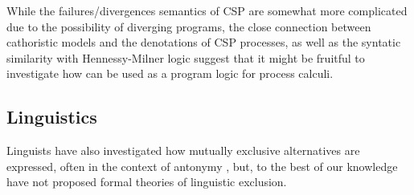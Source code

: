 While the failures/divergences semantics of CSP are somewhat more
complicated due to the possibility of diverging programs, the close
connection between cathoristic models and the denotations of CSP processes,
as well as the syntatic similarity with Hennessy-Milner logic suggest
that it might be fruitful to investigate how \cathoristic{} can be used
as a program logic for process calculi.

\subsection{Linguistics}

Linguists have also investigated how mutually exclusive alternatives
are expressed, often in the context of antonymy
\cite{OKeeffeA:rouhanocl,AronoffM:hanlin,AllanK:conencos}, but, to the
best of our knowledge have not proposed formal theories of linguistic
exclusion.

